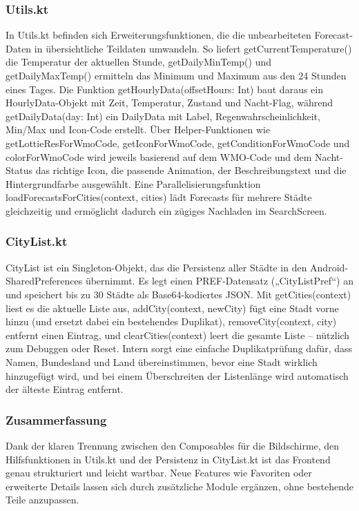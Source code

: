 \documentclass{article}
\begin{document}
\subsubsection{Utils.kt}

In Utils.kt befinden sich Erweiterungsfunktionen, die die unbearbeiteten Forecast-Daten in übersichtliche Teildaten umwandeln. So liefert getCurrentTemperature() die Temperatur der aktuellen Stunde, getDailyMinTemp() und getDailyMaxTemp() ermitteln das Minimum und Maximum aus den 24 Stunden eines Tages. Die Funktion getHourlyData(offsetHours: Int) baut daraus ein HourlyData-Objekt mit Zeit, Temperatur, Zustand und Nacht-Flag, während getDailyData(day: Int) ein DailyData mit Label, Regenwahrscheinlichkeit, Min/Max und Icon-Code erstellt. Über Helper-Funktionen wie getLottieResForWmoCode, getIconForWmoCode, getConditionForWmoCode und colorForWmoCode wird jeweils basierend auf dem WMO-Code und dem Nacht-Status das richtige Icon, die passende Animation, der Beschreibungstext und die Hintergrundfarbe ausgewählt. Eine Parallelisierungsfunktion loadForecastsForCities(context, cities) lädt Forecasts für mehrere Städte gleichzeitig und ermöglicht dadurch ein zügiges Nachladen im SearchScreen.

\subsubsection{CityList.kt}

CityList ist ein Singleton-Objekt, das die Persistenz aller Städte in den Android-SharedPreferences übernimmt. Es legt einen PREF-Datensatz („CityListPref“) an und speichert bis zu 30 Städte als Base64-kodiertes JSON. Mit getCities(context) liest es die aktuelle Liste aus, addCity(context, newCity) fügt eine Stadt vorne hinzu (und ersetzt dabei ein bestehendes Duplikat), removeCity(context, city) entfernt einen Eintrag, und clearCities(context) leert die gesamte Liste – nützlich zum Debuggen oder Reset. Intern sorgt eine einfache Duplikatprüfung dafür, dass Namen, Bundesland und Land übereinstimmen, bevor eine Stadt wirklich hinzugefügt wird, und bei einem Überschreiten der Listenlänge wird automatisch der älteste Eintrag entfernt.

\subsubsection{Zusammerfassung}

Dank der klaren Trennung zwischen den Composables für die Bildschirme, den Hilfsfunktionen in Utils.kt und der Persistenz in CityList.kt ist das Frontend genau strukturiert und leicht wartbar. Neue Features wie Favoriten oder erweiterte Details lassen sich durch zusätzliche Module ergänzen, ohne bestehende Teile anzupassen.
\end{document}
